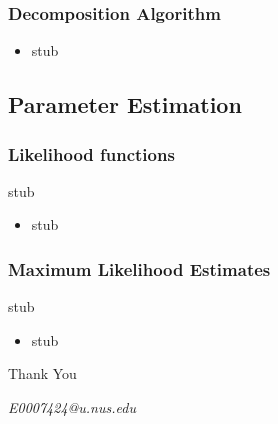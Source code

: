 \documentclass{beamer}
\begin{document}
\begin{frame}
\frametitle{Decomposition Algorithm}
\begin{itemize}
	\item stub
\end{itemize}
\end{frame}

\subsection{Parameter Estimation}
\begin{frame}
\frametitle{Likelihood functions}
stub
\begin{itemize}
	\item stub
\end{itemize}
\end{frame}

\begin{frame}
\frametitle{Maximum Likelihood Estimates}
stub
\begin{itemize}
	\item stub
\end{itemize}
\end{frame}

\begin{frame}
\Huge{\centerline{Thank You}}
\begin{center}
\begin{normalsize}
\emph{E0007424@u.nus.edu}
\end{normalsize}
\end{center}
\end{frame}


\end{document}
